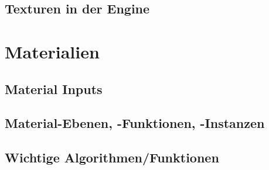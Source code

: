 \subsection{Texturen in der Engine}
\label{sec:tex_inside_engine}

\section{Materialien}
\label{sec:materials}

\subsection{Material Inputs}
\label{sec:mat_inputs}

\subsection{Material-Ebenen, -Funktionen, -Instanzen}
\label{sec:mat_lay_func_ins}

\subsection{Wichtige Algorithmen/Funktionen}
\label{sec:algorithms}

